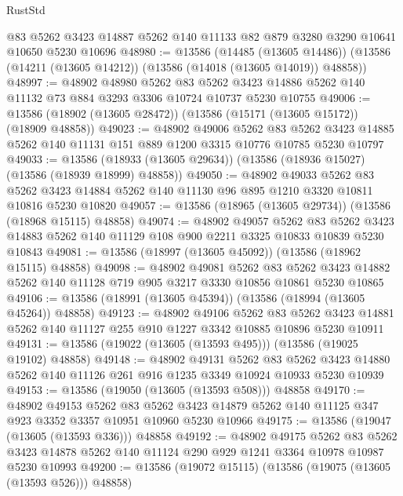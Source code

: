 \begin{lexlean}{RustStd}
\begin{coremodule}
    @83
    @5262
    @3423
    @14887
    @5262
    @140
    @11133
    @82
    @879
    @3280
    @3290
    @10641
    @10650
    @5230
    @10696
@48980 := @13586
    (@14485 (@13605 @14486))
    (@13586 (@14211 (@13605 @14212)) (@13586 (@14018 (@13605 @14019)) @48858))
@48997 := @48902
    @48980
    @5262
    @83
    @5262
    @3423
    @14886
    @5262
    @140
    @11132
    @73
    @884
    @3293
    @3306
    @10724
    @10737
    @5230
    @10755
@49006 := @13586 (@18902 (@13605 @28472)) (@13586 (@15171 (@13605 @15172)) (@18909 @48858))
@49023 := @48902
    @49006
    @5262
    @83
    @5262
    @3423
    @14885
    @5262
    @140
    @11131
    @151
    @889
    @1200
    @3315
    @10776
    @10785
    @5230
    @10797
@49033 := @13586 (@18933 (@13605 @29634)) (@13586 (@18936 @15027) (@13586 (@18939 @18999) @48858))
@49050 := @48902
    @49033
    @5262
    @83
    @5262
    @3423
    @14884
    @5262
    @140
    @11130
    @96
    @895
    @1210
    @3320
    @10811
    @10816
    @5230
    @10820
@49057 := @13586 (@18965 (@13605 @29734)) (@13586 (@18968 @15115) @48858)
@49074 := @48902
    @49057
    @5262
    @83
    @5262
    @3423
    @14883
    @5262
    @140
    @11129
    @108
    @900
    @2211
    @3325
    @10833
    @10839
    @5230
    @10843
@49081 := @13586 (@18997 (@13605 @45092)) (@13586 (@18962 @15115) @48858)
@49098 := @48902
    @49081
    @5262
    @83
    @5262
    @3423
    @14882
    @5262
    @140
    @11128
    @719
    @905
    @3217
    @3330
    @10856
    @10861
    @5230
    @10865
@49106 := @13586 (@18991 (@13605 @45394)) (@13586 (@18994 (@13605 @45264)) @48858)
@49123 := @48902
    @49106
    @5262
    @83
    @5262
    @3423
    @14881
    @5262
    @140
    @11127
    @255
    @910
    @1227
    @3342
    @10885
    @10896
    @5230
    @10911
@49131 := @13586 (@19022 (@13605 (@13593 @495))) (@13586 (@19025 @19102) @48858)
@49148 := @48902
    @49131
    @5262
    @83
    @5262
    @3423
    @14880
    @5262
    @140
    @11126
    @261
    @916
    @1235
    @3349
    @10924
    @10933
    @5230
    @10939
@49153 := @13586 (@19050 (@13605 (@13593 @508))) @48858
@49170 := @48902
    @49153
    @5262
    @83
    @5262
    @3423
    @14879
    @5262
    @140
    @11125
    @347
    @923
    @3352
    @3357
    @10951
    @10960
    @5230
    @10966
@49175 := @13586 (@19047 (@13605 (@13593 @336))) @48858
@49192 := @48902
    @49175
    @5262
    @83
    @5262
    @3423
    @14878
    @5262
    @140
    @11124
    @290
    @929
    @1241
    @3364
    @10978
    @10987
    @5230
    @10993
@49200 := @13586 (@19072 @15115) (@13586 (@19075 (@13605 (@13593 @526))) @48858)

\end{coremodule}
\end{lexlean}
